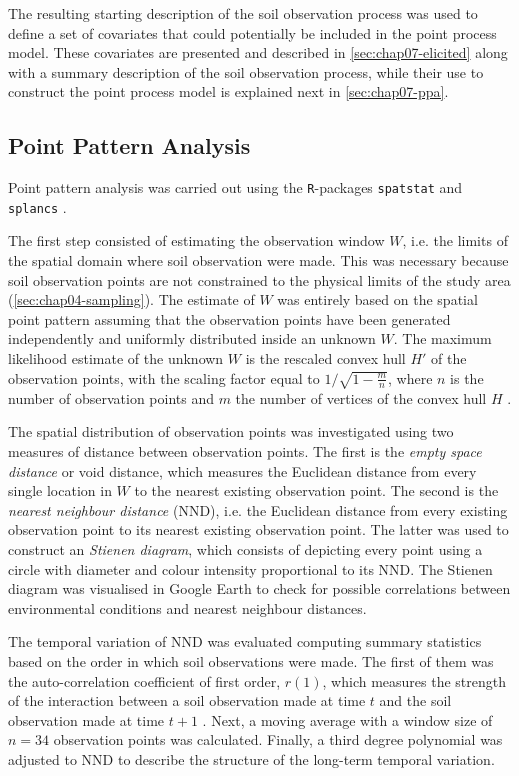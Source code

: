 The resulting starting description of the soil observation process was used to define a set of covariates that 
could potentially be included in the point process model. These covariates are presented and described in 
\autoref{sec:chap07-elicited} along with a summary description of the soil observation process, while their 
use to construct the point process model is explained next in \autoref{sec:chap07-ppa}. 

\subsection{Point Pattern Analysis}
\label{sec:chap07-ppa}

Point pattern analysis was carried out using the \texttt{R}-packages \texttt{spatstat} \cite{Baddeley2010} and 
\texttt{splancs} \cite{RowlingsonEtAl1993}.

The first step consisted of estimating the observation window $W$, i.e. the limits of the spatial domain where 
soil observation were made. This was necessary because soil observation points are not constrained to the 
physical limits of the study area (\autoref{sec:chap04-sampling}). The estimate of $W$ was entirely based on 
the spatial point pattern assuming that the observation points have been generated independently and uniformly 
distributed inside an unknown $W$. The maximum likelihood estimate of the unknown $W$ is the rescaled convex 
hull $H'$ of the observation points, with the scaling factor equal to $1/\sqrt{1 - \frac m n}$, where $n$ is 
the number of observation points and $m$ the number of vertices of the convex hull $H$ \cite{RipleyEtAl1977}.

The spatial distribution of observation points was investigated using two measures of distance between 
observation points. The first is the \emph{empty space distance} or void distance, which measures the 
Euclidean distance from every single location in $W$ to the nearest existing observation point. The second is 
the \emph{nearest neighbour distance} (NND), i.e. the Euclidean distance from every existing observation point 
to its nearest existing observation point. The latter was used to construct an \emph{Stienen diagram}, which 
consists of depicting every point using a circle with diameter and colour intensity proportional to its 
NND. The Stienen diagram was visualised in Google Earth\rr{} to check for possible correlations between 
environmental conditions and nearest neighbour distances.

The temporal variation of NND was evaluated computing summary statistics based on the order in which soil 
observations were made. The first of them was the auto-correlation coefficient of first order, $r(1)$, which 
measures the strength of the interaction between a soil observation made at time $t$ and the soil observation 
made at time $t + 1$ \cite{Pruscha2013}. Next, a moving average with a window size of $n = 34$ observation 
points was calculated. Finally, a third degree polynomial was adjusted to NND to describe the structure of 
the long-term temporal variation.

